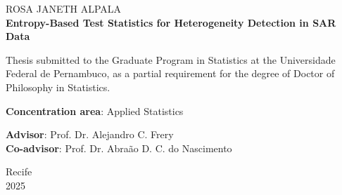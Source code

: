 \begin{titlepage}
  \thispagestyle{empty}
    \begin{center}
    {\large ROSA JANETH ALPALA}\\[4cm]
    {\Large \textbf{Entropy-Based Test Statistics for Heterogeneity Detection in SAR Data }}\\[4cm]
  \end{center}

  \noindent
  \hspace*{0.3\textwidth}
  \begin{minipage}{0.65\textwidth}
    Thesis submitted to the Graduate Program in Statistics at 
    the Universidade Federal de Pernambuco, as a partial requirement 
    for the degree of Doctor of Philosophy  in Statistics.
    
    \vspace{1em}
    \textbf{Concentration area}: Applied Statistics
    
    \vspace{2em} 
    \textbf{Advisor}: Prof. Dr. Alejandro C. Frery \\
    \textbf{Co-advisor}: Prof. Dr. Abraão D. C. do Nascimento
  \end{minipage}
  
  \vfill
  \begin{center}
    Recife\\
    2025
  \end{center}
\end{titlepage}


